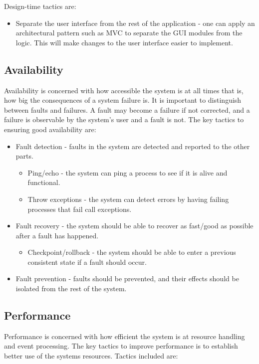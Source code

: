 Design-time tactics are:

\begin{itemize}
	\item Separate the user interface from the rest of the application - one can apply an architectural pattern such as MVC to separate the GUI modules from the logic. This will make changes to the user interface easier to implement.
\end{itemize}

\subsection{Availability}
Availability is concerned with how accessible the system is at all times that is, how big the consequences of a system failure is. It is important to distinguish between faults and failures. A fault may become a failure if not corrected, and a failure is observable by the system's user and a fault is not\cite{bass2003software}. The key tactics to ensuring good availability are: 

\begin{itemize}
	\item Fault detection - faults in the system are detected and reported to the other parts.
        \begin{itemize}
	\item Ping/echo - the system can ping a process to see if it is alive and functional.
	\item Throw exceptions - the system can detect errors by having failing processes that fail call exceptions.
	\end{itemize}
	\item Fault recovery - the system should be able to recover as fast/good as possible after a fault has happened.
        \begin{itemize}
	\item Checkpoint/rollback - the system should be able to enter a previous consistent state if a fault should occur.
	\end{itemize}
	\item Fault prevention - faults should be prevented, and their effects should be isolated from the rest of the system.
\end{itemize}


\subsection{Performance}
Performance is concerned with how efficient the system is at resource handling and event processing. The key tactics to improve performance is to establish better use of the systems resources. Tactics included are:

